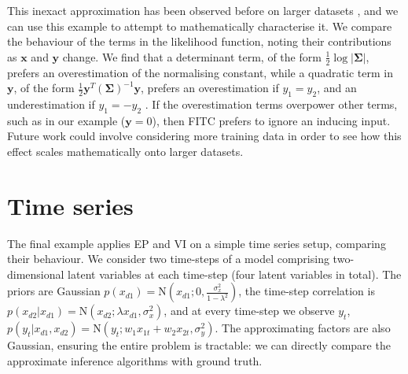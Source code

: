 \documentclass{article}
\renewcommand{\vec}[1]{\mathbf{#1}}
\newcommand{\matr}[1]{\mathbf{#1}}
\begin{document}
This inexact approximation has been observed before on larger datasets \citep{bauer_understanding_2016, bui_unifying_2017}, and we can use this example to attempt to mathematically characterise it. We compare the behaviour of the terms in the likelihood function, noting their contributions as $\vec{x}$ and $\vec{y}$ change. We find that a determinant term, of the form $\frac{1}{2}\log{|\matr{\Sigma}|}$, prefers an overestimation of the normalising constant, while a quadratic term in $\vec{y}$, of the form $\frac{1}{2}\vec{y}^T\left(\matr{\Sigma}\right)^{-1}\vec{y}$, prefers an overestimation if $y_1=y_2$, and an underestimation if $y_1=-y_2$ \citep{swaroop_understanding_2017}. If the overestimation terms overpower other terms, such as in our example ($\vec{y}=0$), then FITC prefers to ignore an inducing input. Future work could involve considering more training data in order to see how this effect scales mathematically onto larger datasets.
%
\section{Time series} \label{sec:Time Series}
%
The final example applies EP and VI on a simple time series setup, comparing their behaviour. We consider two time-steps of a model comprising two-dimensional latent variables at each time-step (four latent variables in total). The priors are Gaussian $p(x_{d1}) = \mathrm{N}\left(x_{d1};0,\frac{\sigma_x^2}{1-\lambda^2}\right)$, the time-step correlation is $p(x_{d2}|x_{d1}) = \mathrm{N}(x_{d2};\lambda x_{d1},\sigma_x^2)$, and at every time-step we observe $y_t$, $p(y_t|x_{d1},x_{d2}) = \mathrm{N}(y_t;w_1x_{1t} + w_2x_{2t},\sigma_y^2)$. The approximating factors are also Gaussian, ensuring the entire problem is tractable: we can directly compare the approximate inference algorithms with ground truth.
\end{document}

